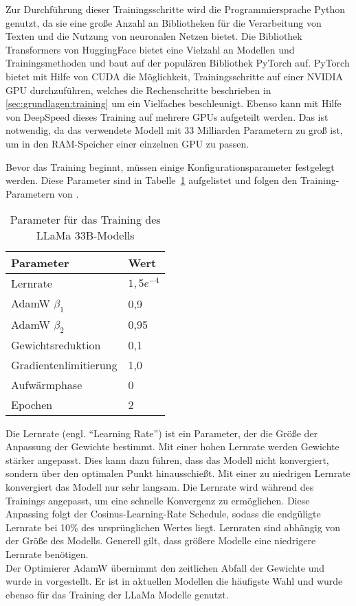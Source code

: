 Zur Durchführung dieser Trainingsschritte wird die Programmiersprache Python genutzt, da sie eine große Anzahl an Bibliotheken für die Verarbeitung von Texten und die Nutzung von neuronalen Netzen bietet.
Die Bibliothek Transformers von HuggingFace bietet eine Vielzahl an Modellen und Trainingsmethoden und baut auf der populären Bibliothek PyTorch auf.
PyTorch bietet mit Hilfe von CUDA die Möglichkeit, Trainingsschritte auf einer NVIDIA GPU durchzuführen, welches die Rechenschritte beschrieben in \ref{sec:grundlagen:training} um ein Vielfaches beschleunigt. %
Ebenso kann mit Hilfe von DeepSpeed dieses Training auf mehrere GPUs aufgeteilt werden.
Das ist notwendig, da das verwendete Modell mit 33 Milliarden Parametern zu groß ist, um in den RAM-Speicher einer einzelnen GPU zu passen.

Bevor das Training beginnt, müssen einige Konfigurationsparameter festgelegt werden.
Diese Parameter sind in Tabelle~\ref{tab:training:parameter} aufgelistet und folgen den Training-Parametern von \citet{llama}.\\

\begin{table}
    \centering
    \begin{tabular}{ll}
        \hline
        \textbf{Parameter} & \textbf{Wert} \\
        \hline
        Lernrate & $1,5e^{-4}$\\
        AdamW $\beta_1$ & 0,9\\
        AdamW $\beta_2$ & 0,95\\
        Gewichtsreduktion & 0,1\\
        Gradientenlimitierung & 1,0\\
        Aufwärmphase & 0\\
        Epochen & 2\\
        \hline
    \end{tabular}
    \caption{Parameter für das Training des LLaMa 33B-Modells}
    \label{tab:training:parameter}
\end{table}

Die Lernrate (engl. \enquote{Learning Rate}) ist ein Parameter, der die Größe der Anpassung der Gewichte bestimmt.
Mit einer hohen Lernrate werden Gewichte stärker angepasst.
Dies kann dazu führen, dass das Modell nicht konvergiert, sondern über den optimalen Punkt hinausschießt.
Mit einer zu niedrigen Lernrate konvergiert das Modell nur sehr langsam.
Die Lernrate wird während des Trainings angepasst, um eine schnelle Konvergenz zu ermöglichen.
Diese Anpassing folgt der Cosinus-Learning-Rate Schedule, sodass die endgüligte Lernrate bei 10\% des ursprünglichen Wertes liegt.
Lernraten sind abhängig von der Größe des Modells.
Generell gilt, dass größere Modelle eine niedrigere Lernrate benötigen.\\
Der Optimierer AdamW übernimmt den zeitlichen Abfall der Gewichte und wurde  in \citet{adamw} vorgestellt. %
Er ist in aktuellen Modellen die häufigste Wahl und wurde ebenso für das Training der LLaMa Modelle genutzt.\\

